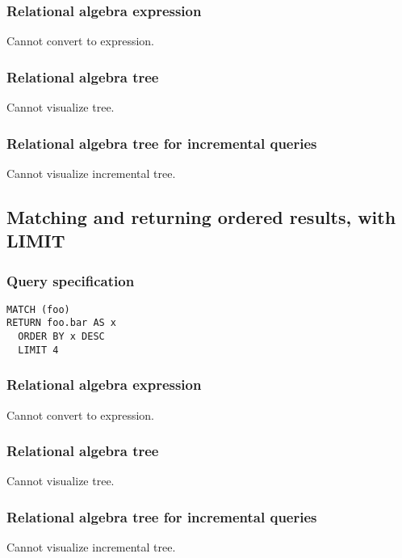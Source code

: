 \subsubsection*{Relational algebra expression}

Cannot convert to expression.

\subsubsection*{Relational algebra tree}

Cannot visualize tree.

\subsubsection*{Relational algebra tree for incremental queries}

Cannot visualize incremental tree.

\subsection{Matching and returning ordered results, with LIMIT}

\subsubsection*{Query specification}

\begin{lstlisting}
MATCH (foo)
RETURN foo.bar AS x
  ORDER BY x DESC
  LIMIT 4
\end{lstlisting}

\subsubsection*{Relational algebra expression}

Cannot convert to expression.

\subsubsection*{Relational algebra tree}

Cannot visualize tree.

\subsubsection*{Relational algebra tree for incremental queries}

Cannot visualize incremental tree.

